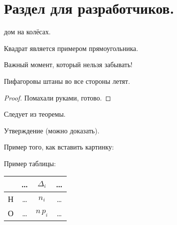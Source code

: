 \section{Раздел для разработчиков.}

\begin{definition}[Автомобиль]
    дом на колёсах.
\end{definition}

\begin{example}
    Квадрат является примером прямоугольника.
\end{example}

\begin{important}
    Важный момент, который нельзя забывать!
\end{important}

\begin{theorem}
    Пифагоровы штаны во все стороны летят.
\end{theorem} 

\begin{proof}
    Помахали руками, готово.
\end{proof}

\begin{corollary}
    Следует из теоремы.
\end{corollary}

\begin{statement}
    Утверждение (можно доказать).
\end{statement}

Пример того, как вставить картинку:
\begin{figure}[H]
	\centering
	\footnotesize
\end{figure}

Пример таблицы:
\begin{table}[htb]
	\centering
	\begin{tabular}{|c|c|c|c|}
		\hline
		& \dots & $\Delta_i$  & \dots \\
		\hline
		Н & \dots & $n_i$ & \dots \\
		\hline
		О & \dots & $n \, p_i$ & \dots \\
		\hline
	\end{tabular}
\end{table}